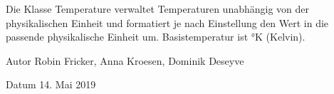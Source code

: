 Die Klasse Temperature verwaltet Temperaturen unabhängig von der physikalischen Einheit und formatiert je nach Einstellung den Wert in die passende physikalische Einheit um. Basistemperatur ist °K (Kelvin). \begin{DoxyAuthor}{Autor}
Robin Fricker, Anna Kroesen, Dominik Deseyve 
\end{DoxyAuthor}
\begin{DoxyDate}{Datum}
14. Mai 2019 
\end{DoxyDate}
